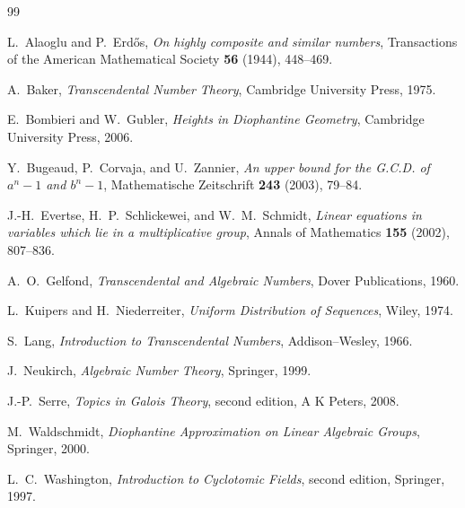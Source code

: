 \documentclass[11pt,oneside]{article}
\theoremstyle{definition}
\theoremstyle{remark}
\begin{document}
\begin{thebibliography}{99}

L.~Alaoglu and P.~Erd\H{o}s,
\emph{On highly composite and similar numbers},
Transactions of the American Mathematical Society \textbf{56} (1944),
448--469.

A.~Baker,
\emph{Transcendental Number Theory},
Cambridge University Press, 1975.

E.~Bombieri and W.~Gubler,
\emph{Heights in Diophantine Geometry},
Cambridge University Press, 2006.

Y.~Bugeaud, P.~Corvaja, and U.~Zannier,
\emph{An upper bound for the G.C.D. of $a^n-1$ and $b^n-1$},
Mathematische Zeitschrift \textbf{243} (2003), 79--84.

J.-H.~Evertse, H.~P.~Schlickewei, and W.~M.~Schmidt,
\emph{Linear equations in variables which lie in a multiplicative group},
Annals of Mathematics \textbf{155} (2002), 807--836.

A.~O.~Gelfond,
\emph{Transcendental and Algebraic Numbers},
Dover Publications, 1960.

L.~Kuipers and H.~Niederreiter,
\emph{Uniform Distribution of Sequences},
Wiley, 1974.

S.~Lang,
\emph{Introduction to Transcendental Numbers},
Addison--Wesley, 1966.

J.~Neukirch,
\emph{Algebraic Number Theory},
Springer, 1999.

J.-P.~Serre,
\emph{Topics in Galois Theory}, second edition,
A K Peters, 2008.

M.~Waldschmidt,
\emph{Diophantine Approximation on Linear Algebraic Groups},
Springer, 2000.

L.~C.~Washington,
\emph{Introduction to Cyclotomic Fields}, second edition,
Springer, 1997.

\end{thebibliography}
\end{document}
